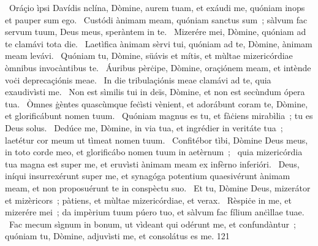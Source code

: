 {~Oráçio ìpsi Davídis}
{%
nclína, Dòmine, aurem tuam, et exáudi me, quóniam inops et pauper sum ego.
~Custódi ànimam meam, quóniam sanctus sum~; sàlvum fac servum tuum, Deus meus, speràntem in te.
~Mizerére mei, Dòmine, quóniam ad te clamávi tota die.
~Laetìfica ànimam sèrvi tui, quóniam ad te, Dòmine, ànimam meam levávi.
~Quóniam tu, Dòmine, süávis et mítis, et mùltae mizericórdiae òmnibus invocàntibus te.
~Áuribus pèrċipe, Dòmine, oraçiónem meam, et intènde voċi deprecaçiónis meae.
~In die tribulaçiónis meae clamávi ad te, quia exaudivìsti me.
~Non est sìmilis tui in deïs, Dòmine, et non est secùndum ópera tua.
~Òmnes ġèntes quascùmque feċìsti vènient, et adorábunt coram te, Dòmine, et glorificábunt nomen tuum.
~Quóniam magnus es tu, et fàċiens mirabìlia~; tu es Deus solus.
~Dedúce me, Dòmine, in via tua, et ingrédier in veritáte tua~; laetétur cor meum ut tìmeat nomen tuum.
~Confitébor tìbi, Dòmine Deus meus, in toto corde meo, et glorificábo nomen tuum in aetèrnum~;
~quia mizericórdia tua magna est super me, et eruvìsti ànimam meam ex infèrno inferióri.
~Deus, iníqui insurrexérunt super me, et synagóga potentium quaesivérunt ànimam meam, et non proposuérunt te in conspèctu suo.
~Et tu, Dòmine Deus, mizerátor et mizèricors~; pàtiens, et mùltae mizericórdiae, et verax.
~Rèspiċe in me, et mizerére mei~; da impèrium tuum púero tuo, et sàlvum fac fílium anċìllae tuae.
~Fac mecum sìgnum in bonum, ut vìdeant qui odérunt me, et confundàntur~; quóniam tu, Dòmine, adjuvìsti me, et consolátus es me.}
{12}{1}
